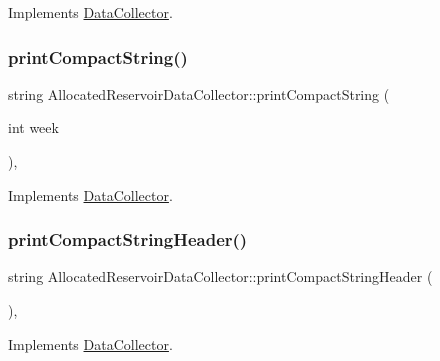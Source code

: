 Implements \mbox{\hyperlink{classDataCollector_a01486bf58acbe37b203f97b3b9a79c40}{Data\+Collector}}.

\mbox{\label{classAllocatedReservoirDataCollector_a35f8125d428e65c737ff3360ae9bd0cd}} 
\subsubsection{\texorpdfstring{print\+Compact\+String()}{printCompactString()}}
{\footnotesize\ttfamily string Allocated\+Reservoir\+Data\+Collector\+::print\+Compact\+String (\begin{DoxyParamCaption}\item[{int}]{week }\end{DoxyParamCaption})\hspace{0.3cm}{\ttfamily [override]}, {\ttfamily [virtual]}}



Implements \mbox{\hyperlink{classDataCollector_a2eac264fa5612aed5a830b12de4f4ae3}{Data\+Collector}}.

\mbox{\label{classAllocatedReservoirDataCollector_adbedebdf593bee81447671fb8f6ef2fe}} 
\subsubsection{\texorpdfstring{print\+Compact\+String\+Header()}{printCompactStringHeader()}}
{\footnotesize\ttfamily string Allocated\+Reservoir\+Data\+Collector\+::print\+Compact\+String\+Header (\begin{DoxyParamCaption}{ }\end{DoxyParamCaption})\hspace{0.3cm}{\ttfamily [override]}, {\ttfamily [virtual]}}



Implements \mbox{\hyperlink{classDataCollector_a98dcb4ec871d9c7fbf7545c64e5ccc67}{Data\+Collector}}.

